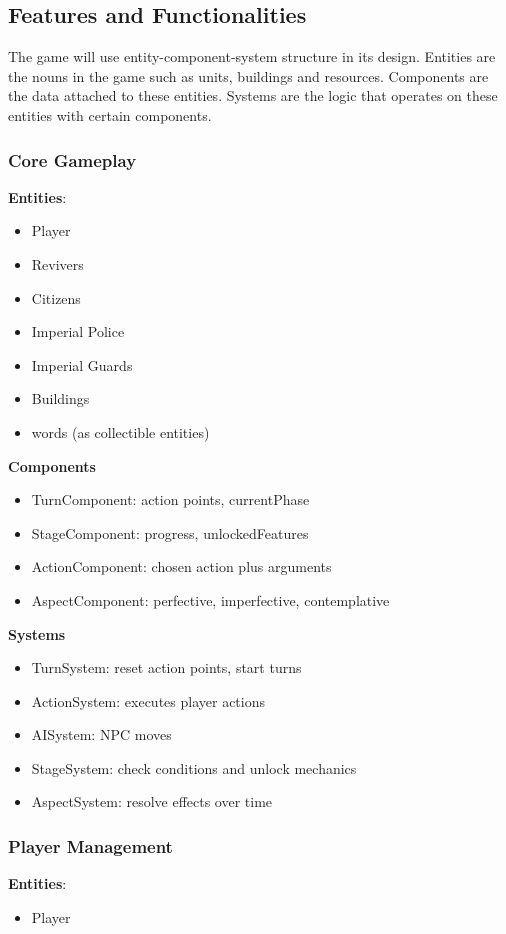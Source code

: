 \documentclass[11pt]{article}
\begin{document}
\subsection{Features and Functionalities}
The game will use entity-component-system structure in its design. Entities are the nouns in the game such as units, buildings and resources. Components are the data attached to these entities. Systems are the logic that operates on these entities with certain components.

\subsubsection{Core Gameplay}
\textbf{Entities}:
\begin{itemize}
\item
  Player
\item
  Revivers
\item
  Citizens
\item
  Imperial Police
\item
  Imperial Guards
\item Buildings
\item
  words (as collectible entities)
\end{itemize}

\textbf{Components}
\begin{itemize}
\item
  TurnComponent: action points, currentPhase
\item
  StageComponent: progress, unlockedFeatures
\item
  ActionComponent: chosen action plus arguments
\item
  AspectComponent: perfective, imperfective, contemplative
\end{itemize}

\textbf{Systems}
\begin{itemize}
\item
  TurnSystem: reset action points, start turns
\item
  ActionSystem: executes player actions
\item
  AISystem: NPC moves
\item
  StageSystem: check conditions and unlock mechanics
\item
  AspectSystem: resolve effects over time
\end{itemize}

\subsubsection{Player Management}
\textbf{Entities}:
\begin{itemize}
\item
  Player
\end{itemize}
\end{document}

